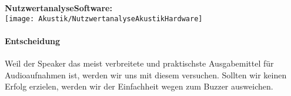 \documentclass[../../main.tex]{subfiles}
\begin{document}
    \textbf{NutzwertanalyseSoftware:}\\
    \texttt{[image: Akustik/NutzwertanalyseAkustikHardware]}
    \paragraph{Entscheidung}
    Weil der Speaker das meist verbreitete und praktischste Ausgabemittel für Audioaufnahmen ist, werden wir uns mit diesem versuchen.
    Sollten wir keinen Erfolg erzielen, werden wir der Einfachheit wegen zum Buzzer ausweichen.


  
\end{document}
